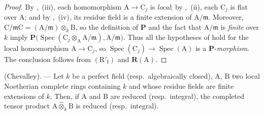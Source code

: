 \begin{proof}
By ,~(iii), each homomorphism $\mathrm{A}\to\mathrm{C}_j$ is \emph{local}; by ,~(ii), each $\mathrm{C}_j$ is flat over $\mathrm{A}$; and by ,~(iv), its residue field is a finite extension of $\mathrm{A}/\mathfrak{m}$. Moreover, $\mathrm{C}/\mathfrak{m}\mathrm{C}
=(\mathrm{A}/\mathfrak{m})\otimes_k\mathrm{B}$,
so the definition of $\boldsymbol{P}$ and the fact that $\mathrm{A}/\mathfrak{m}$ is \emph{finite} over $k$ imply $\boldsymbol{P}\bigl(\operatorname{Spec}(\mathrm{C}_j\otimes_\mathrm{A}\mathrm{A}/\mathfrak{m}),\mathrm{A}/\mathfrak{m}\bigr)$.
Thus all the hypotheses of  hold for the local homomorphism $\mathrm{A}\to\mathrm{C}_j$, so $\operatorname{Spec}(\mathrm{C}_j)\to\operatorname{Spec}(\mathrm{A})$ is a $\boldsymbol{P}$-\emph{morphism}. The conclusion follows from $(\mathrm{R}'_{\mathrm{I}})$ and $\boldsymbol{R}(\mathrm{A})$.
\end{proof}

\begin{corollary}[7.5.7]
\label{IV.7.5.7}
(Chevalley). --- Let $k$ be a perfect field \textup{(resp.}\ algebraically closed), $\mathrm{A}$, $\mathrm{B}$ two local Noetherian complete rings containing $k$ and whose residue fields are finite extensions of $k$. Then, if $\mathrm{A}$ and $\mathrm{B}$ are reduced \textup{(resp.}\ integral), the completed tensor product $\mathrm{A}\widehat{\otimes}_k\mathrm{B}$ is reduced \textup{(resp.}\ integral).
\end{corollary}

